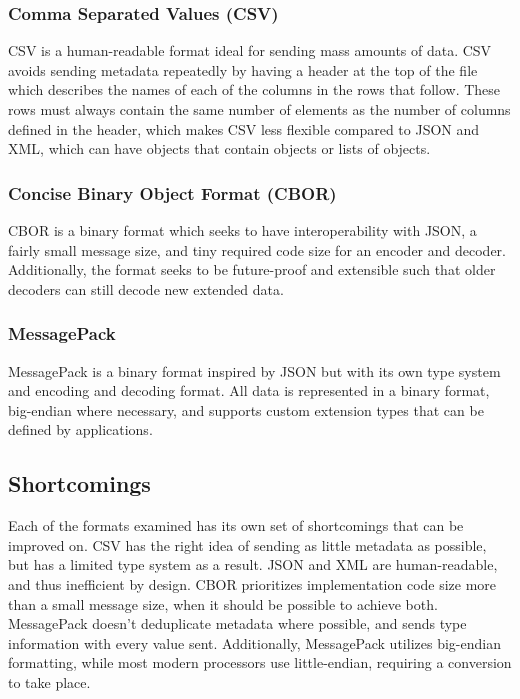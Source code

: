 \documentclass[conference]{IEEEtran}
\begin{document}
\subsubsection{Comma Separated Values (CSV)}

CSV\cite{csv_spec} is a human-readable format ideal for sending mass amounts of data. CSV avoids sending metadata repeatedly by having a header at the top of the file which describes the names of each of the columns in the rows that follow. These rows must always contain the same number of elements as the number of columns defined in the header, which makes CSV less flexible compared to JSON and XML, which can have objects that contain objects or lists of objects.

\subsubsection{Concise Binary Object Format (CBOR)}

CBOR\cite{cbor_spec} is a binary format which seeks to have interoperability with JSON, a fairly small message size, and tiny required code size for an encoder and decoder. Additionally, the format seeks to be future-proof and extensible such that older decoders can still decode new extended data.

\subsubsection{MessagePack}

MessagePack\cite{msgpack_spec} is a binary format inspired by JSON but with its own type system and encoding and decoding format. All data is represented in a binary format, big-endian where necessary, and supports custom extension types that can be defined by applications.

\subsection{Shortcomings}

Each of the formats examined has its own set of shortcomings that can be improved on. CSV has the right idea of sending as little metadata as possible, but has a limited type system as a result. JSON and XML are human-readable, and thus inefficient by design. CBOR prioritizes implementation code size more than a small message size, when it should be possible to achieve both. MessagePack doesn't deduplicate metadata where possible, and sends type information with every value sent. Additionally, MessagePack utilizes big-endian formatting, while most modern processors use little-endian, requiring a conversion to take place.
\end{document}
